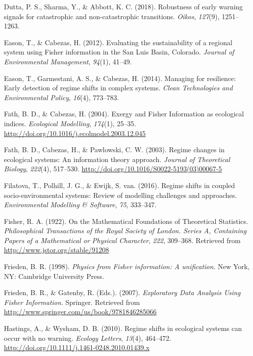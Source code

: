 \documentclass[12pt,twoside,openany]{reedthesis}
\begin{document}
\hypertarget{ref-dutta2018robustness}{}
Dutta, P. S., Sharma, Y., \& Abbott, K. C. (2018). Robustness of early
warning signals for catastrophic and non-catastrophic transitions.
\emph{Oikos}, \emph{127}(9), 1251--1263.

\hypertarget{ref-eason_evaluating_2012}{}
Eason, T., \& Cabezas, H. (2012). Evaluating the sustainability of a
regional system using Fisher information in the San Luis Basin,
Colorado. \emph{Journal of Environmental Management}, \emph{94}(1),
41--49.

\hypertarget{ref-eason2014managing}{}
Eason, T., Garmestani, A. S., \& Cabezas, H. (2014). Managing for
resilience: Early detection of regime shifts in complex systems.
\emph{Clean Technologies and Environmental Policy}, \emph{16}(4),
773--783.

\hypertarget{ref-fath_exergy_2004}{}
Fath, B. D., \& Cabezas, H. (2004). Exergy and Fisher Information as
ecological indices. \emph{Ecological Modelling}, \emph{174}(1), 25--35.
\url{http://doi.org/10.1016/j.ecolmodel.2003.12.045}

\hypertarget{ref-fath_regime_2003}{}
Fath, B. D., Cabezas, H., \& Pawlowski, C. W. (2003). Regime changes in
ecological systems: An information theory approach. \emph{Journal of
Theoretical Biology}, \emph{222}(4), 517--530.
\url{http://doi.org/10.1016/S0022-5193(03)00067-5}

\hypertarget{ref-filatova2016regime}{}
Filatova, T., Polhill, J. G., \& Ewijk, S. van. (2016). Regime shifts in
coupled socio-environmental systems: Review of modelling challenges and
approaches. \emph{Environmental Modelling \& Software}, \emph{75},
333--347.

\hypertarget{ref-fisher_mathematical_1922}{}
Fisher, R. A. (1922). On the Mathematical Foundations of Theoretical
Statistics. \emph{Philosophical Transactions of the Royal Society of
London. Series A, Containing Papers of a Mathematical or Physical
Character}, \emph{222}, 309--368. Retrieved from
\url{http://www.jstor.org/stable/91208}

\hypertarget{ref-frieden_physics_1998}{}
Frieden, B. R. (1998). \emph{Physics from Fisher information: A
unification.} New York, NY: Cambridge University Press.

\hypertarget{ref-frieden_exploratory_2007}{}
Frieden, B. R., \& Gatenby, R. (Eds.). (2007). \emph{Exploratory Data
Analysis Using Fisher Information}. Springer. Retrieved from
\url{http://www.springer.com/us/book/9781846285066}

\hypertarget{ref-hastings_regime_2010}{}
Hastings, A., \& Wysham, D. B. (2010). Regime shifts in ecological
systems can occur with no warning. \emph{Ecology Letters}, \emph{13}(4),
464--472. \url{http://doi.org/10.1111/j.1461-0248.2010.01439.x}
\end{document}
